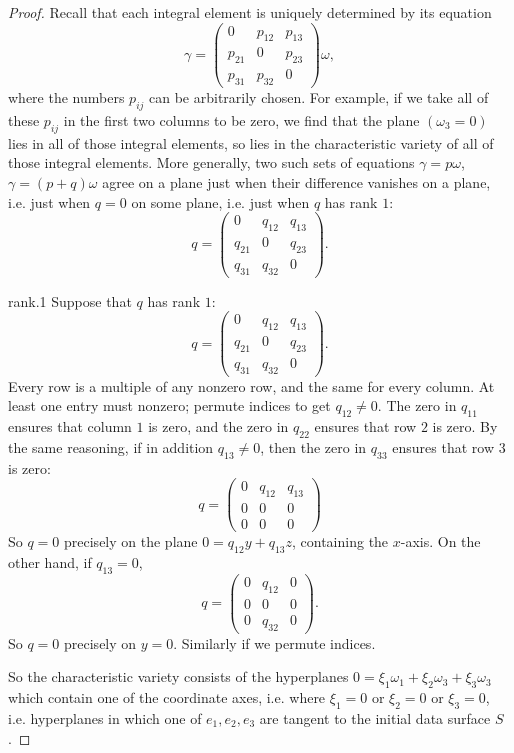 \begin{proof}
Recall that each integral element is uniquely determined by its equation
\[
\gamma=
\begin{pmatrix}
0 & p_{12} & p_{13} \\
p_{21} & 0 & p_{23} \\
p_{31} & p_{32} & 0 
\end{pmatrix}
\omega,
\]
where the numbers \(p_{ij}\) can be arbitrarily chosen.
For example, if we take all of these \(p_{ij}\) in the first two columns to be zero, we find that the plane \((\omega_3=0)\) lies in all of those integral elements, so lies in the characteristic variety of all of those integral elements.
More generally, two such sets of equations \(\gamma=p \omega\), \(\gamma=(p+q)\omega\) agree on a plane just when their difference vanishes on a plane, i.e. just when \(q=0\) on some plane, i.e. just when \(q\) has rank \(1\):
\[
q=
\begin{pmatrix}
0 & q_{12} & q_{13} \\
q_{21} & 0 & q_{23} \\
q_{31} & q_{32} & 0 
\end{pmatrix}.
\]
\begin{answer}{rank.1}%
Suppose that \(q\) has rank \(1\):
\[
q=
\begin{pmatrix}
0 & q_{12} & q_{13} \\
q_{21} & 0 & q_{23} \\
q_{31} & q_{32} & 0 
\end{pmatrix}.
\]
Every row is a multiple of any nonzero row, and the same for every column.
At least one entry must nonzero; permute indices to get \(q_{12}\ne 0\).
The zero in \(q_{11}\) ensures that column \(1\) is zero, and the zero in \(q_{22}\) ensures that row \(2\) is zero.
By the same reasoning, if in addition \(q_{13}\ne 0\), then the zero in \(q_{33}\) ensures that row \(3\) is zero:
\[
q=
\begin{pmatrix}
0 & q_{12} & q_{13} \\
0 & 0 & 0 \\
0 & 0 & 0 
\end{pmatrix}
\]
So \(q=0\) precisely on the plane \(0=q_{12}y+q_{13}z\), containing the \(x\)-axis.
On the other hand, if \(q_{13}=0\),
\[
q=
\begin{pmatrix}
0 & q_{12} & 0 \\
0 & 0 & 0 \\
0 & q_{32} & 0 
\end{pmatrix}.
\]
So \(q=0\) precisely on \(y=0\).
Similarly if we permute indices.
\end{answer}
So the characteristic variety consists of the hyperplanes \(0=\xi_1\omega_1+\xi_2\omega_3+\xi_3\omega_3\) which contain one of the coordinate axes, i.e. where \(\xi_1=0\) or \(\xi_2=0\) or \(\xi_3=0\), i.e. hyperplanes in which one of \(e_1,e_2,e_3\) are tangent to the initial data surface \(S\).
\end{proof}
